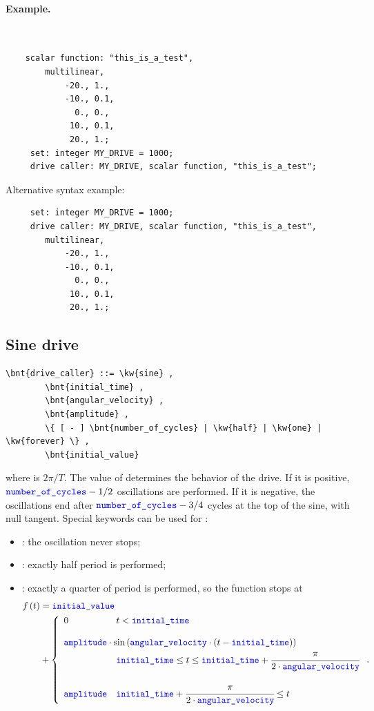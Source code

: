 \paragraph{Example.} \
\begin{verbatim}
    scalar function: "this_is_a_test",
        multilinear,
            -20., 1.,
            -10., 0.1,
              0., 0.,
             10., 0.1,
             20., 1.;
     set: integer MY_DRIVE = 1000;
     drive caller: MY_DRIVE, scalar function, "this_is_a_test";
\end{verbatim}
Alternative syntax example:
\begin{verbatim}
     set: integer MY_DRIVE = 1000;
     drive caller: MY_DRIVE, scalar function, "this_is_a_test",
        multilinear,
            -20., 1.,
            -10., 0.1,
              0., 0.,
             10., 0.1,
             20., 1.;
\end{verbatim}

\subsection{Sine drive}
\begin{Verbatim}[commandchars=\\\{\}]
    \bnt{drive_caller} ::= \kw{sine} ,
        \bnt{initial_time} ,
        \bnt{angular_velocity} ,
        \bnt{amplitude} ,
        \{ [ - ] \bnt{number_of_cycles} | \kw{half} | \kw{one} | \kw{forever} \} , 
        \bnt{initial_value}
\end{Verbatim}
where  is $2\pi/T$.
The value of  determines the behavior of the drive. 
If it is positive, $\textcolor{blue}{\texttt{number\_of\_cycles}}-1/2$ oscillations are performed. 
If it is negative, the oscillations end after 
$\textcolor{blue}{\texttt{number\_of\_cycles}}-3/4$ cycles at the top of the sine, with null
tangent.
Special keywords can be used for :
\begin{itemize}
	\item {}: the oscillation never stops;
	\item {}: exactly half period is performed;
	\item {}: exactly a quarter of period is performed,
	so the function stops at
\begin{align}
	f\plbr{t} &= \nt{initial\_value} \\
	&+ \lcubr{\matr{ll}{
		0 & t < \nt{initial\_time} \\
		\\
		\multicolumn{2}{l}{
		\nt{amplitude} \cdot \sin\plbr{\nt{angular\_velocity} \cdot \plbr{
			t - \nt{initial\_time}
		}}
		} \\
			& \nt{initial\_time} \le t
				\le \nt{initial\_time} + \cfrac{\pi}{2 \cdot \nt{angular\_velocity}} \\
		\\
		\nt{amplitude}
			& \nt{initial\_time} + \cfrac{\pi}{2 \cdot \nt{angular\_velocity}} \le t
	}} \nonumber .
\end{align}
\end{itemize}

